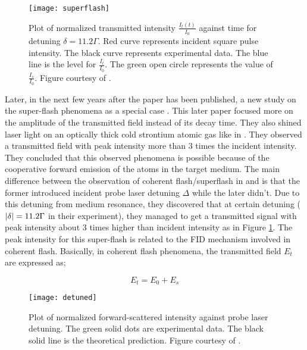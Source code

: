 \newpage

\begin{figure}
    \centering
    \texttt{[image: superflash]}
    \caption{Plot of normalized transmitted intensity $\frac{I_{t}(t)}{I_{0}}$ against time for detuning $\delta = 11.2\Gamma$. Red curve represents incident square pulse intensity. The black curve represents experimental data. The blue line is the level for $\frac{I_t}{I_0}$. The green open circle represents the value of $\frac{I_{s}}{I_{0}}$. Figure courtesy of \cite{Kwong2014}.}
    \label{fig: superflash}
\end{figure}

Later, in the next few years after the paper \cite{Chalony2011} has been published, a new study on the super-flash phenomena as a special case \cite{Kwong2014}. This later paper focused more on the amplitude of the transmitted field instead of its decay time. They also shined laser light on an optically thick cold strontium atomic gas like in \cite{Chalony2011}. They observed a transmitted field with peak intensity more than 3 times the incident intensity. They concluded that this observed phenomena is possible because of the cooperative forward emission of the atoms in the target medium. The main difference between the observation of coherent flash/superflash in \cite{Kwong2014} and \cite{Chalony2011} is that the former introduced incident probe laser detuning $\Delta$ while the later didn't. Due to this detuning from medium resonance, they discovered that at certain detuning ($\abs{\delta} = 11.2 \Gamma$ in their experiment), they managed to get a transmitted signal with peak intensity about 3 times higher than incident intensity as in Figure \ref{fig: superflash}. The peak intensity for this super-flash is related to the FID mechanism involved in coherent flash. Basically, in coherent flash phenomena, the transmitted field $E_{t}$ are expressed as;

\begin{equation}
    E_{t} = E_{0} + E_{s}
\end{equation}

\begin{figure}[h!]
    \centering
    \texttt{[image: detuned]}
    \caption{Plot of normalized forward-scattered intensity against probe laser detuning. The green solid dots are experimental data. The black solid line is the theoretical prediction. Figure courtesy of \cite{Kwong2014}.}
    \label{fig: detuned}
\end{figure}

